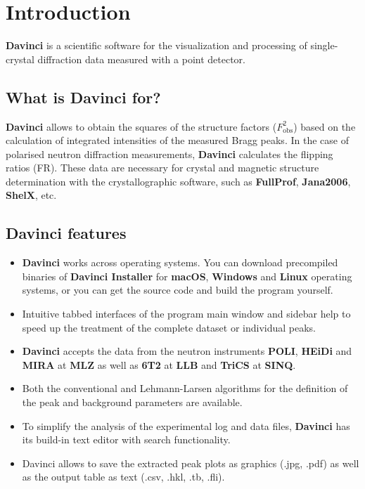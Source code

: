 \chapter{Introduction}

\textbf{Davinci} is a scientific software for the visualization and processing of single-crystal diffraction data measured with a point detector.

\section{What is Davinci for?}

\textbf{Davinci} allows to obtain the squares of the structure factors  ($F^2_\text{obs}$) based on the calculation of integrated intensities of the measured Bragg peaks. In the case of polarised neutron diffraction measurements, \textbf{Davinci} calculates the flipping ratios (FR). These data are necessary for crystal and magnetic structure determination with the crystallographic software, such as \textbf{FullProf}, \textbf{Jana2006}, \textbf{ShelX}, etc.

\section{Davinci features}
\begin{itemize}
	\item {}
		\textbf{Davinci} works across operating systems. You can download precompiled binaries of \textbf{Davinci Installer} for \textbf{macOS}, \textbf{Windows} and \textbf{Linux} operating systems, or you can get the source code and build the program yourself.
	\item {}
		Intuitive tabbed interfaces of the program main window and sidebar help to speed up the treatment of the complete dataset or individual peaks.
	\item {}
		\textbf{Davinci} accepts the data from the neutron instruments \textbf{POLI}, \textbf{HEiDi} and \textbf{MIRA} at \textbf{MLZ} as well as \textbf{6T2} at \textbf{LLB} and \textbf{TriCS} at \textbf{SINQ}.
	\item {}
		Both the conventional and Lehmann-Larsen algorithms for the definition of the peak and background parameters are available.
	\item {}
		To simplify the analysis of the experimental log and data files, \textbf{Davinci} has its build-in text editor with search functionality.
	\item {}
		Davinci allows to save the extracted peak plots as graphics (.jpg, .pdf) as well as the output table as text (.csv, .hkl, .tb, .fli).
\end{itemize}
